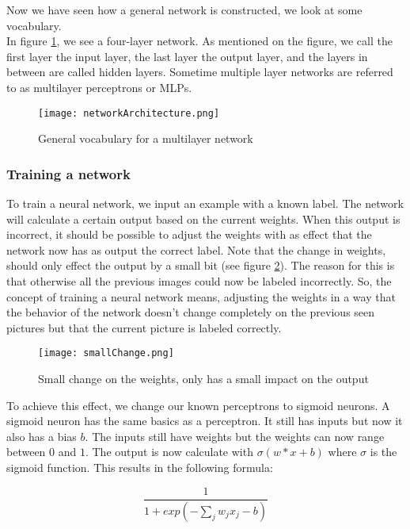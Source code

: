 Now we have seen how a general network is constructed, we look at some vocabulary. \\
In figure \ref{fig:networkArch}, we see a four-layer network. As mentioned on the figure, we call the first layer the input layer, the last layer the output layer, and the layers in between are called hidden layers. Sometime multiple layer networks are referred to as multilayer perceptrons or MLPs.

\begin{figure}[htbp]
	\centering
	\texttt{[image: networkArchitecture.png]}
	\caption{General vocabulary for a multilayer network \cite{NNintro:online}}
	\label{fig:networkArch}
\end{figure} 		


		\subsubsection{Training a network}
		
To train a neural network, we input an example with a known label. The network will calculate a certain output based on the current weights. When this output is incorrect, it should be possible to adjust the weights with as effect that the network now has as output the correct label. Note that the change in weights, should only effect the output by a small bit (see figure \ref{fig:smallChange}). The reason for this is that otherwise all the previous images could now be labeled incorrectly. So, the concept of training a neural network means, adjusting the weights in a way that the behavior of the network doesn't change completely on the previous seen pictures but that the current picture is labeled correctly.

\begin{figure}[htbp]
	\centering
	\texttt{[image: smallChange.png]}
	\caption{Small change on the weights, only has a small impact on the output \cite{NNintro:online}}
	\label{fig:smallChange}
\end{figure} 

To achieve this effect, we change our known perceptrons to sigmoid neurons. A sigmoid neuron has the same basics as a perceptron. It still has inputs but now it also has a bias $b$. The inputs still have weights but the weights can now range between $0$ and $1$. The output is now calculate with $\sigma(w*x+b)$ where $\sigma$ is the sigmoid function. This results in the following formula: 

\begin{equation} 
\frac{1}{1+exp(-\sum_j w_jx_j-b)}
\end{equation}

